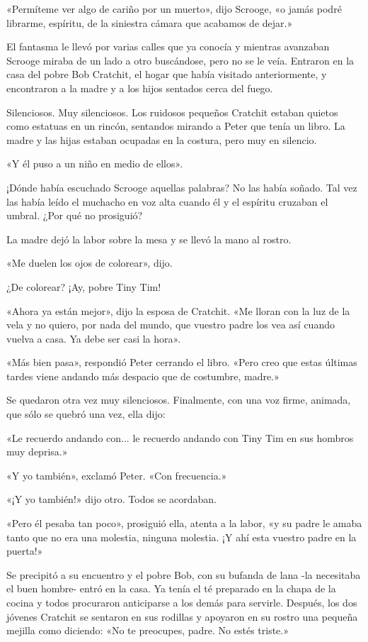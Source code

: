 \documentclass{novela}
\begin{document}
 «Permíteme ver algo de cariño por un muerto», dijo Scrooge, «o jamás podré librarme, espíritu, de la siniestra cámara que acabamos de dejar.»

 El fantasma le llevó por varias calles que ya conocía y mientras avanzaban Scrooge miraba de un lado a otro buscándose, pero no se le veía. Entraron en la casa del pobre Bob Cratchit, el hogar que había visitado anteriormente, y encontraron a la madre y a los hijos sentados cerca del fuego.

 Silenciosos. Muy silenciosos. Los ruidosos pequeños Cratchit estaban quietos como estatuas en un rincón, sentandos mirando a Peter que tenía un libro. La madre y las hijas estaban ocupadas en la costura, pero muy en silencio.

 «Y él puso a un niño en medio de ellos».

 ¡Dónde había escuchado Scrooge aquellas palabras? No las había soñado. Tal vez las había leído el muchacho en voz alta cuando él y el espíritu cruzaban el umbral. ¿Por qué no prosiguió?

 La madre dejó la labor sobre la mesa y se llevó la mano al rostro.

 «Me duelen los ojos de colorear», dijo.

 ¿De colorear? ¡Ay, pobre Tiny Tim!

 «Ahora ya están mejor», dijo la esposa de Cratchit. «Me lloran con la luz de la vela y no quiero, por nada del mundo, que vuestro padre los vea así cuando vuelva a casa. Ya debe ser casi la hora».

 «Más bien pasa», respondió Peter cerrando el libro. «Pero creo que estas últimas tardes viene andando más despacio que de costumbre, madre.»

 Se quedaron otra vez muy silenciosos. Finalmente, con una voz firme, animada, que sólo se quebró una vez, ella dijo:

 «Le recuerdo andando con... le recuerdo andando con Tiny Tim en sus hombros muy deprisa.»

 «Y yo también», exclamó Peter. «Con frecuencia.»

 «¡Y yo también!» dijo otro. Todos se acordaban.

 «Pero él pesaba tan poco», prosiguió ella, atenta a la labor, «y su padre le amaba tanto que no era una molestia, ninguna molestia. ¡Y ahí esta vuestro padre en la puerta!»

 Se precipitó a su encuentro y el pobre Bob, con su bufanda de lana -la necesitaba el buen hombre- entró en la casa. Ya tenía el té preparado en la chapa de la cocina y todos procuraron anticiparse a los demás para servirle. Después, los dos jóvenes Cratchit se sentaron en sus rodillas y apoyaron en su rostro una pequeña mejilla como diciendo: «No te preocupes, padre. No estés triste.»
\end{document}
